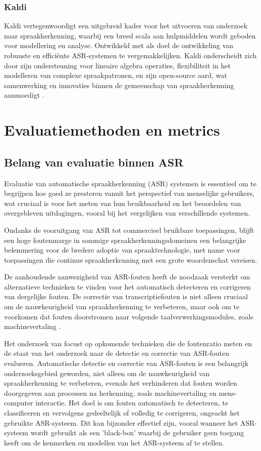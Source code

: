 \subsubsection{Kaldi}

Kaldi vertegenwoordigt een uitgebreid kader voor het uitvoeren van onderzoek naar spraakherkenning, waarbij een breed scala aan hulpmiddelen wordt geboden voor modellering en analyse. Ontwikkeld met als doel de ontwikkeling van robuuste en efficiënte ASR-systemen te vergemakkelijken. Kaldi onderscheidt zich door zijn ondersteuning voor lineaire algebra operaties, flexibiliteit in het modelleren van complexe spraakpatronen, en zijn open-source aard, wat samenwerking en innovaties binnen de gemeenschap van spraakherkenning aanmoedigt \autocite{Povey_ASRU2011}.


\section{Evaluatiemethoden en metrics}
\subsection{Belang van evaluatie binnen ASR}
Evaluatie van automatische spraakherkenning (ASR) systemen is essentieel 
om te begrijpen hoe goed ze presteren vanuit het perspectief van menselijke gebruikers, wat cruciaal is voor het meten van hun bruikbaarheid en het beoordelen van overgebleven uitdagingen, vooral bij het vergelijken van verschillende systemen. 

Ondanks de vooruitgang van ASR tot commercieel bruikbare toepassingen, blijft een hoge foutenmarge in sommige spraakherkenningsdomeinen een belangrijke belemmering voor de bredere adoptie van spraaktechnologie, met name voor toepassingen die continue spraakherkenning met een grote woordenschat vereisen.

De aanhoudende aanwezigheid van ASR-fouten heeft de noodzaak versterkt om alternatieve technieken te vinden voor het automatisch detecteren en corrigeren van dergelijke fouten. De correctie van transcriptiefouten is niet alleen cruciaal om de nauwkeurigheid van spraakherkenning te verbeteren, maar ook om te voorkomen dat fouten doorstromen naar volgende taalverwerkingsmodules, zoals machinevertaling \autocite{Errattahi_2018}.

Het onderzoek van \textcite{Errattahi_2018} focust op opkomende technieken die de foutenratio meten en de staat van het onderzoek naar de detectie en correctie van ASR-fouten evalueren. Automatische detectie en correctie van ASR-fouten is een belangrijk onderzoeksgebied geworden, niet alleen om de nauwkeurigheid van spraakherkenning te verbeteren, evenals het verhinderen dat fouten worden doorgegeven aan processen na herkenning, zoals machinevertaling en mens-computer interactie. Het doel is om fouten automatisch te detecteren, te classificeren en vervolgens gedeeltelijk of volledig te corrigeren, ongeacht het gebruikte ASR-systeem. Dit kan bijzonder effectief zijn, vooral wanneer het ASR-systeem wordt gebruikt als een 'black-box' waarbij de gebruiker geen toegang heeft om de kenmerken en modellen van het ASR-systeem af te stellen.

